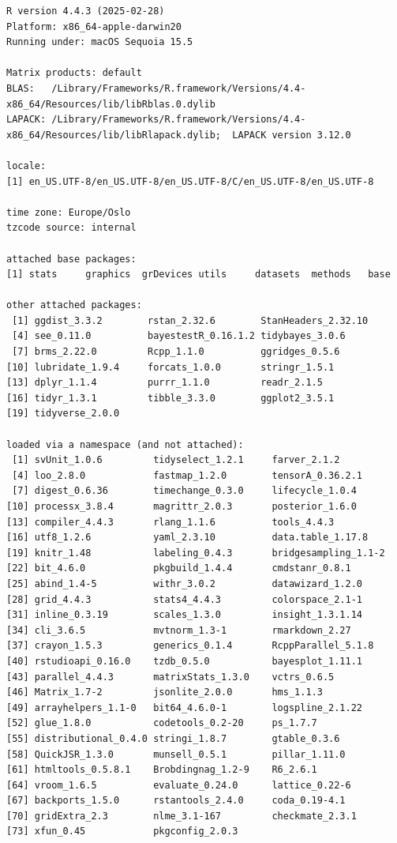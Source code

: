 \documentclass[
  doc,
  longtable,
  nolmodern,
  notxfonts,
  notimes,
  colorlinks=true,linkcolor=blue,citecolor=blue,urlcolor=blue]{apa7}
\begin{document}
\begin{verbatim}
R version 4.4.3 (2025-02-28)
Platform: x86_64-apple-darwin20
Running under: macOS Sequoia 15.5

Matrix products: default
BLAS:   /Library/Frameworks/R.framework/Versions/4.4-x86_64/Resources/lib/libRblas.0.dylib 
LAPACK: /Library/Frameworks/R.framework/Versions/4.4-x86_64/Resources/lib/libRlapack.dylib;  LAPACK version 3.12.0

locale:
[1] en_US.UTF-8/en_US.UTF-8/en_US.UTF-8/C/en_US.UTF-8/en_US.UTF-8

time zone: Europe/Oslo
tzcode source: internal

attached base packages:
[1] stats     graphics  grDevices utils     datasets  methods   base     

other attached packages:
 [1] ggdist_3.3.2        rstan_2.32.6        StanHeaders_2.32.10
 [4] see_0.11.0          bayestestR_0.16.1.2 tidybayes_3.0.6    
 [7] brms_2.22.0         Rcpp_1.1.0          ggridges_0.5.6     
[10] lubridate_1.9.4     forcats_1.0.0       stringr_1.5.1      
[13] dplyr_1.1.4         purrr_1.1.0         readr_2.1.5        
[16] tidyr_1.3.1         tibble_3.3.0        ggplot2_3.5.1      
[19] tidyverse_2.0.0    

loaded via a namespace (and not attached):
 [1] svUnit_1.0.6         tidyselect_1.2.1     farver_2.1.2        
 [4] loo_2.8.0            fastmap_1.2.0        tensorA_0.36.2.1    
 [7] digest_0.6.36        timechange_0.3.0     lifecycle_1.0.4     
[10] processx_3.8.4       magrittr_2.0.3       posterior_1.6.0     
[13] compiler_4.4.3       rlang_1.1.6          tools_4.4.3         
[16] utf8_1.2.6           yaml_2.3.10          data.table_1.17.8   
[19] knitr_1.48           labeling_0.4.3       bridgesampling_1.1-2
[22] bit_4.6.0            pkgbuild_1.4.4       cmdstanr_0.8.1      
[25] abind_1.4-5          withr_3.0.2          datawizard_1.2.0    
[28] grid_4.4.3           stats4_4.4.3         colorspace_2.1-1    
[31] inline_0.3.19        scales_1.3.0         insight_1.3.1.14    
[34] cli_3.6.5            mvtnorm_1.3-1        rmarkdown_2.27      
[37] crayon_1.5.3         generics_0.1.4       RcppParallel_5.1.8  
[40] rstudioapi_0.16.0    tzdb_0.5.0           bayesplot_1.11.1    
[43] parallel_4.4.3       matrixStats_1.3.0    vctrs_0.6.5         
[46] Matrix_1.7-2         jsonlite_2.0.0       hms_1.1.3           
[49] arrayhelpers_1.1-0   bit64_4.6.0-1        logspline_2.1.22    
[52] glue_1.8.0           codetools_0.2-20     ps_1.7.7            
[55] distributional_0.4.0 stringi_1.8.7        gtable_0.3.6        
[58] QuickJSR_1.3.0       munsell_0.5.1        pillar_1.11.0       
[61] htmltools_0.5.8.1    Brobdingnag_1.2-9    R6_2.6.1            
[64] vroom_1.6.5          evaluate_0.24.0      lattice_0.22-6      
[67] backports_1.5.0      rstantools_2.4.0     coda_0.19-4.1       
[70] gridExtra_2.3        nlme_3.1-167         checkmate_2.3.1     
[73] xfun_0.45            pkgconfig_2.0.3     
\end{verbatim}
\end{document}
